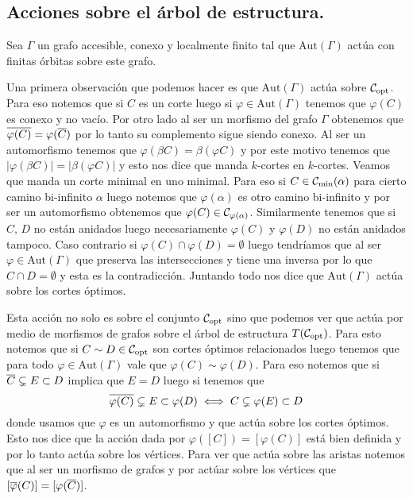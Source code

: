 \documentclass[tesis.tex]{subfiles}
\newcommand{\aut}{\text{Aut}}
\begin{document}
\subsection{Acciones sobre el árbol de estructura.}

Sea $\Gamma$ un grafo accesible, conexo y localmente finito tal que $\aut(\Gamma)$ actúa con finitas órbitas sobre este grafo.

Una primera observación que podemos hacer es que $\aut(\Gamma)$ actúa sobre ${\cal C}_{\text{opt}}$.
Para eso notemos que si $C$ es un corte luego si $\varphi \in \aut(\Gamma)$ tenemos que $\varphi(C)$ es conexo y no vacío. 
Por otro lado al ser un morfismo del grafo $\Gamma$ obtenemos que $\overline{\varphi(C)} = \varphi(\overline C)$ por lo tanto su complemento sigue siendo conexo.
Al ser un automorfismo tenemos que $\varphi(\beta C) = \beta (\varphi C)$ y por este motivo tenemos que $|\varphi (\beta C)| = |\beta (\varphi C)|$ y esto nos dice que manda $k$-cortes en $k$-cortes.
Veamos que manda un corte minimal en uno minimal. 
Para eso si $C \in {{\cal C}}_{\text{min}}(\alpha)$ para cierto camino bi-infinito $\alpha$ luego notemos que $\varphi(\alpha)$ es otro camino bi-infinito y por ser un automorfismo obtenemos que $\varphi(C) \in {\cal C}_{\varphi(\alpha)}$.
Similarmente tenemos que si $C$, $D$ no están anidados luego necesariamente $\varphi(C)$ y $\varphi(D)$ no están anidados tampoco.
Caso contrario si $\varphi(C) \cap \varphi(D) = \emptyset$ luego tendríamos que al ser $\varphi \in \aut(\Gamma)$ que preserva las intersecciones y tiene una inversa por lo que $C \cap D = \emptyset$ y esta es la contradicción.
Juntando todo nos dice que $\aut(\Gamma)$ actúa sobre los cortes óptimos.

Esta acción no solo es sobre el conjunto ${\cal C}_{\text{opt}}$ sino que podemos ver que actúa por medio de morfismos de grafos sobre el árbol de estructura $T({\cal C}_{\text{opt}})$.
Para esto notemos que si $C \sim D \in {\cal C}_{\text{opt}}$ son cortes óptimos relacionados luego tenemos que para todo $\varphi \in \aut(\Gamma)$ vale que $\varphi(C) \sim \varphi(D)$.
Para eso notemos que si $\overline C \subsetneq E \subset D$ implica que $E = D$ luego si tenemos que
\[
	\overline {\varphi(C)} \subsetneq E \subset \varphi(D) \iff C \subsetneq \varphi(E) \subset D
\]  
donde usamos que $\varphi$ es un automorfismo y que actúa sobre los cortes óptimos.
Esto nos dice que la acción dada por $\varphi([C]) = [\varphi (C)]$ está bien definida y por lo tanto actúa sobre los vértices.
Para ver que actúa sobre las aristas notemos que al ser un morfismo de grafos y por actúar sobre los vértices que $[\overline \varphi(C)] = [\varphi (\overline C)]$.
\end{document}
